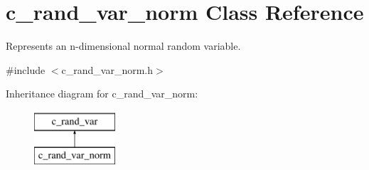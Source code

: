 \hypertarget{classc__rand__var__norm}{\section{c\-\_\-rand\-\_\-var\-\_\-norm \-Class \-Reference}
\label{classc__rand__var__norm}
}


\-Represents an n-\/dimensional normal random variable.  




{\ttfamily \#include $<$c\-\_\-rand\-\_\-var\-\_\-norm.\-h$>$}

\-Inheritance diagram for c\-\_\-rand\-\_\-var\-\_\-norm\-:\begin{figure}[H]
\begin{center}
\leavevmode
\includegraphics[height=2.000000cm]{classc__rand__var__norm}
\end{center}
\end{figure}
